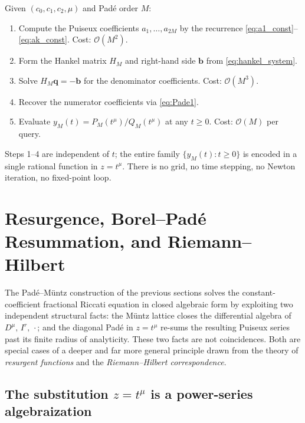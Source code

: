 \documentclass[11pt,a4paper]{article}
\begin{document}
Given \((c_0,c_1,c_2,\mu)\) and Pad\'e order \(M\):
\begin{enumerate}[label=\textbf{Step \arabic*.},leftmargin=2.5em,nosep]
\item Compute the Puiseux coefficients \(a_1,\ldots,a_{2M}\) by the recurrence \eqref{eq:a1_const}--\eqref{eq:ak_const}. Cost: \(\mathcal{O}(M^2)\).
\item Form the Hankel matrix \(H_M\) and right-hand side \(\bm{b}\) from \eqref{eq:hankel_system}.
\item Solve \(H_M\bm{q}=-\bm{b}\) for the denominator coefficients. Cost: \(\mathcal{O}(M^3)\).
\item Recover the numerator coefficients via \eqref{eq:Pade1}.
\item Evaluate \(y_M(t)=P_M(t^\mu)/Q_M(t^\mu)\) at any \(t\ge0\). Cost: \(\mathcal{O}(M)\) per query.
\end{enumerate}
Steps 1--4 are independent of \(t\); the entire family \(\{y_M(t):t\ge0\}\) is encoded in a single rational function in \(z=t^\mu\).
There is no grid, no time stepping, no Newton iteration, no fixed-point loop.

\section{Resurgence, Borel--Pad\'e Resummation, and Riemann--Hilbert}\label{sec:resurgence}

The Pad\'e--M\"untz construction of the previous sections solves the constant-coefficient fractional Riccati equation in closed algebraic form by exploiting two independent structural facts: the M\"untz lattice closes the differential algebra of \(D^\mu,\,I^r,\,\cdot\); and the diagonal Pad\'e in \(z=t^\mu\) re-sums the resulting Puiseux series past its finite radius of analyticity.
These two facts are not coincidences. Both are special cases of a deeper and far more general principle drawn from the theory of \emph{resurgent functions} and the \emph{Riemann--Hilbert correspondence}.

\subsection{The substitution \(z=t^\mu\) is a power-series algebraization}
\end{document}
